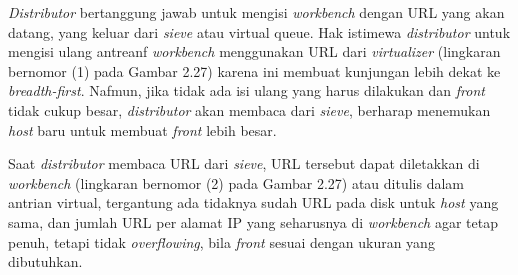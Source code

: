 \emph{Distributor} bertanggung jawab untuk mengisi \emph{workbench} dengan URL yang akan datang, yang keluar dari \emph{sieve} atau virtual queue. Hak istimewa \emph{distributor} untuk mengisi ulang antreanf \emph{workbench} menggunakan URL dari \emph{virtualizer} (lingkaran bernomor (1) pada Gambar 2.27) karena ini membuat kunjungan lebih dekat ke \emph{breadth-first}. Nafmun, jika tidak ada isi ulang yang harus dilakukan dan \emph{front} tidak cukup besar, \emph{distributor} akan membaca dari \emph{sieve}, berharap menemukan \emph{host} baru untuk membuat \emph{front} lebih besar.

Saat \emph{distributor} membaca URL dari \emph{sieve}, URL tersebut dapat diletakkan di \emph{workbench} (lingkaran bernomor (2) pada Gambar 2.27) atau ditulis dalam antrian virtual, tergantung ada tidaknya sudah URL pada disk untuk \emph{host} yang sama, dan jumlah URL per alamat IP yang seharusnya di \emph{workbench} agar tetap penuh, tetapi tidak \emph{overflowing}, bila \emph{front} sesuai dengan ukuran yang dibutuhkan.

